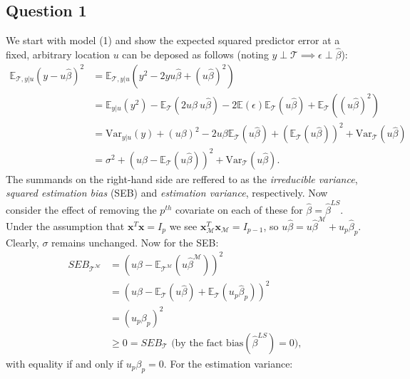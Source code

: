 \documentclass{article}
\begin{document}
\subsection{Question 1}
\vspace{-0.3cm}
We start with model (1) and show the expected squared predictor error at a fixed, arbitrary location $u$ can be deposed as follows (noting $y \perp \mathcal{T} \implies \epsilon \perp \hat\beta$):
\begin{equation*}
\begin{split}
\mathbb{E}_{\mathcal{T},y|u}(y-u\hat{\beta})^2 &= \mathbb{E}_{\mathcal{T},y|u} (y^2-2yu\hat{\beta}+(u\hat{\beta})^2) \\
&= \mathbb{E}_{y|u}(y^2) -\mathbb{E}_{\mathcal{T}}(2u\beta \ u\hat\beta)-2\mathbb{E}(\epsilon)\mathbb{E}_{\mathcal{T}}(u\hat\beta)+ \mathbb{E}_{\mathcal{T}}((u\hat\beta)^2) \\
&=\text{Var}_{y|u}(y)+(u\beta)^2-2 u\beta \mathbb{E}_{\mathcal{T}}(u\hat{\beta})+(\mathbb{E}_{\mathcal{T}}(u\hat{\beta}))^2+\text{Var}_{\mathcal{T}}(u\hat{\beta}) \\
&= \sigma ^2 +(u\beta - \mathbb{E}_{\mathcal{T}}(u\hat{\beta}))^2 + \text{Var}_{\mathcal{T}}(u\hat{\beta}).
\end{split}
\end{equation*}
The summands on the right-hand side are reffered to as the \textit{irreducible variance}, \textit{squared estimation bias} (SEB) and \textit{estimation variance}, respectively. Now consider the effect of removing the $p^{th}$ covariate on each of these for $\hat{\beta}=\hat{\beta}^{LS}$. Under the assumption that $\textbf{x}^T\textbf{x}=I_p$ we see $\textbf{x}_{\mathcal{M}}^T \textbf{x}_{\mathcal{M}}=I_{p-1}$, so $u\hat{\beta}=u\hat{\beta}^{\mathcal{M}}+u_p\hat{\beta}_p$. Clearly, $\sigma$ remains unchanged. Now for the SEB:
\begin{equation*}
\begin{split}
SEB_{\mathcal{T}^{\mathcal{M}}} &= (u\beta -\mathbb{E}_{\mathcal{T}^\mathcal{M}}(u\hat{\beta}^{\mathcal{M}}))^2 \\
&= (u\beta -\mathbb{E}_{\mathcal{T}}(u\hat{\beta})+\mathbb{E}_{\mathcal{T}}(u_p \hat{\beta}_p))^2 \\
&= (u_p{\beta}_p)^2 \\
&\geq 0 = SEB_{\mathcal{T}} \text{ (by the fact } \text{bias}(\hat{\beta}^{LS})=0),
\end{split}
\end{equation*}
with equality if and only if $u_p \beta_p=0$. For the estimation variance:
\end{document}
